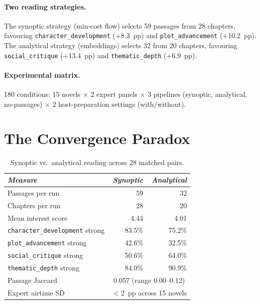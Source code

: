\documentclass{article}
\begin{document}
\paragraph{Two reading strategies.}  The synoptic strategy (min-cost
flow) selects 59 passages from 28 chapters, favouring
\texttt{character\_development} (+8.3~pp) and
\texttt{plot\_advancement} (+10.2~pp).  The analytical strategy
(embeddings) selects 32 from 20 chapters, favouring
\texttt{social\_critique} (+13.4~pp) and \texttt{thematic\_depth}
(+6.9~pp).

\paragraph{Experimental matrix.}  180 conditions: 15 novels $\times$
2 expert panels $\times$ 3 pipelines (synoptic, analytical,
no-passages) $\times$ 2 host-preparation settings (with/without).


\section{The Convergence Paradox}
\label{sec:convergence}

\begin{table}[t]
\caption{Synoptic vs.\ analytical reading across 28 matched pairs.}
\label{tab:convergence}
\begin{tabularx}{\textwidth}{X|r|r}
\toprule
\textit{Measure} & \textit{Synoptic} & \textit{Analytical} \\
\midrule
Passages per run           & 59    & 32    \\
Chapters per run           & 28    & 20    \\
Mean interest score        & 4.44  & 4.01  \\
\texttt{character\_development} strong & 83.5\% & 75.2\% \\
\texttt{plot\_advancement} strong      & 42.6\% & 32.5\% \\
\texttt{social\_critique} strong       & 50.6\% & 64.0\% \\
\texttt{thematic\_depth} strong        & 84.0\% & 90.9\% \\
\addlinespace
Passage Jaccard          & \multicolumn{2}{c}{0.057 (range 0.00--0.12)} \\
Expert airtime SD        & \multicolumn{2}{c}{$<$2~pp across 15 novels} \\
\bottomrule
\end{tabularx}
\end{table}
\end{document}

